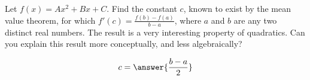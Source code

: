 \documentclass{ximera}
\author{Steven Gubkin}
\begin{document}
\begin{exercise}




Let $f(x) = Ax^2+Bx+C$.  Find the constant $c$, known to exist by the mean value theorem, for which $f'(c) = \frac{f(b)-f(a)}{b-a}$, where $a$ and $b$ are any two distinct real numbers.  The result is a very interesting property of quadratics.  Can you explain this result more conceptually, and less algebraically?

\begin{prompt}
	$$c = \answer{\frac{b-a}{2}}$$
\end{prompt}

\end{exercise}
\end{document}
